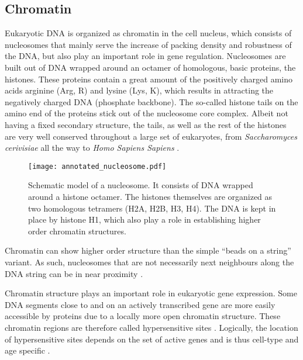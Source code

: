         \subsection{Chromatin}
            Eukaryotic DNA is organized as chromatin in the cell nucleus, which consists of nucleosomes that mainly serve the increase of packing density and robustness of the DNA, but also play an important role in gene regulation. Nucleosomes are built out of DNA wrapped around an octamer of homologous, basic proteins, the histones. These proteins contain a great amount of the positively charged amino acids arginine (Arg, R) and lysine (Lys, K), which results in attracting the negatively charged DNA (phosphate backbone). The so-called histone tails on the amino end of the proteins stick out of the nucleosome core complex. Albeit not having a fixed secondary structure, the tails, as well as the rest of the histones are very well conserved throughout a large set of eukaryotes, from \textit{Saccharomyces cerivisiae} all the way to \textit{Homo Sapiens Sapiens} \cite{berg2015stryer}.

            \begin{figure}[htpb!]
                \centering
                \texttt{[image: annotated\_nucleosome.pdf]}
                \caption{Schematic model of a nucleosome. It consists of DNA wrapped around a histone octamer. The histones themselves are organized as two homologous tetramers (H2A, H2B, H3, H4). The DNA is kept in place by histone H1, which also play a role in establishing higher order chromatin structures.}
                \label{img:nucleosome}
            \end{figure}

            Chromatin can show higher order structure than the simple “beads on a string” variant. As such, nucleosomes that are not necessarily next neighbours along the DNA string can be in near proximity \cite{berg2015stryer}. %

            Chromatin structure plays an important role in eukaryotic gene expression. Some DNA segments close to and on an actively transcribed gene are more easily accessible by proteins due to a locally more open chromatin structure. These chromatin regions are therefore called hypersensitive sites \cite{cooper2017genome}. Logically, the location of hypersensitive sites depends on the set of active genes and is thus cell-type and age specific \cite{berg2015stryer}.

